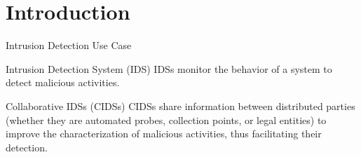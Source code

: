 \section*{Introduction}

\begin{frame}{Intrusion Detection Use Case}

    \begin{block}{Intrusion Detection System (IDS)}
        IDSs monitor the behavior of a system to detect malicious activities.
    \end{block}
    \hfill
    \pause
    \begin{block}{Collaborative IDSs (CIDSs)}
        CIDSs share information between \alert<3>{distributed parties} (whether they are automated probes, collection points, or legal entities) to improve the characterization of malicious activities, thus facilitating their detection.
    \end{block}

\end{frame}



